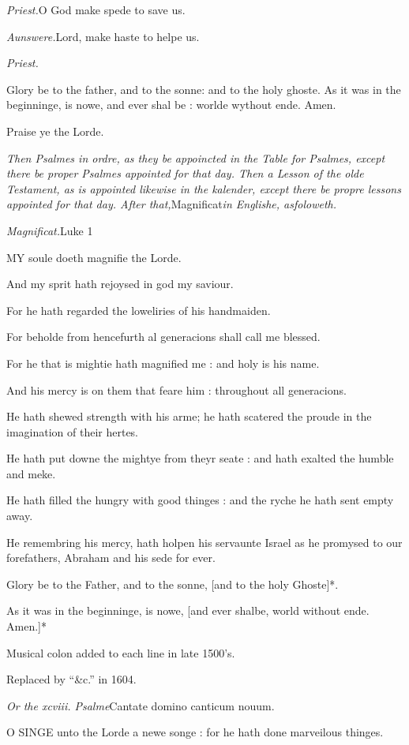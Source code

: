 \emph{Priest.}O God make spede
to save us.

\emph{Aunswere.}Lord, make
haste to helpe us.

\emph{Priest.}

Glory be to the father, and to the sonne: and to the holy ghoste. As it
was in the beginninge, is nowe, and ever shal be : worlde wythout ende.
Amen.

Praise ye the Lorde.

\emph{T}\emph{hen
Psalmes in ordre, as they be appoincted in the Table for Psalmes, except
there be proper Psalmes appointed for that day. Then a Lesson of the olde
Testament, as is appointed likewise in the kalender, except there be propre
lessons appointed for that day. After that,}Magnificat\emph{in Englishe,
asfoloweth.}

\emph{Magnificat.}Luke
1

MY
soule doeth magnifie the Lorde.

And my sprit hath rejoysed in god my saviour.

For he hath regarded the loweliries of his handmaiden.

For beholde from hencefurth al generacions shall call
me blessed.

For he that is mightie hath magnified me : and holy
is his name.

And his mercy is on them that feare him : throughout
all generacions.

He hath shewed strength with his arme; he hath scatered
the proude in the imagination of their hertes.

He hath put downe the mightye from theyr seate : and
hath exalted the humble and meke.

He hath filled the hungry with good thinges : and the
ryche he hath sent empty away.

He remembring his mercy, hath holpen his servaunte
Israel as he promysed to our forefathers, Abraham and his sede for ever.

Glory be to the Father, and to the sonne, [and to the
holy Ghoste]*.

As it was in the beginninge, is nowe, [and ever shalbe,
world without ende. Amen.]*

Musical
colon added to each line in late 1500's.

Replaced
by ``\&c.'' in
1604.

\emph{Or
the xcviii. Psalme}Cantate domino canticum
nouum.

O
SINGE unto the Lorde a newe songe : for he hath done marveilous thinges.

